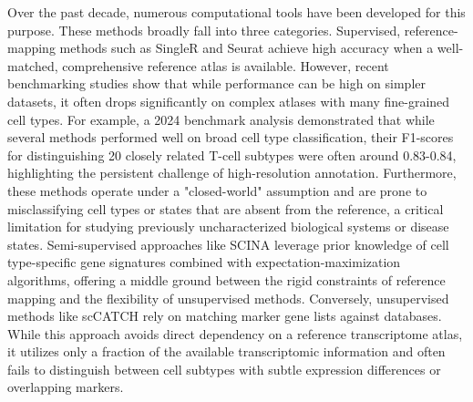 \documentclass[pdflatex,sn-nature]{sn-jnl}%
\theoremstyle{thmstyleone}%
\theoremstyle{thmstyletwo}%
\theoremstyle{thmstylethree}%
\begin{document}
Over the past decade, numerous computational tools have been developed for this purpose\cite{chengReviewSinglecellRNAseq2023}. These methods broadly fall into three categories. Supervised, reference-mapping methods such as SingleR\cite{aran2019reference} and Seurat\cite{stuart2019comprehensive} achieve high accuracy when a well-matched, comprehensive reference atlas is available. However, recent benchmarking studies show that while performance can be high on simpler datasets, it often drops significantly on complex atlases with many fine-grained cell types. For example, a 2024 benchmark analysis demonstrated that while several methods performed well on broad cell type classification, their F1-scores for distinguishing 20 closely related T-cell subtypes were often around 0.83-0.84\cite{Yuan2024scRGCL}, highlighting the persistent challenge of high-resolution annotation. Furthermore, these methods operate under a "closed-world" assumption and are prone to misclassifying cell types or states that are absent from the reference\cite{cao2022openworld}, a critical limitation for studying previously uncharacterized biological systems or disease states. Semi-supervised approaches like SCINA\cite{zhang2019scina} leverage prior knowledge of cell type-specific gene signatures combined with expectation-maximization algorithms, offering a middle ground between the rigid constraints of reference mapping and the flexibility of unsupervised methods. Conversely, unsupervised methods like scCATCH\cite{shao2020sccatch} rely on matching marker gene lists against databases. While this approach avoids direct dependency on a reference transcriptome atlas, it utilizes only a fraction of the available transcriptomic information and often fails to distinguish between cell subtypes with subtle expression differences or overlapping markers\cite{luecken2021benchmarking}.
\end{document}

